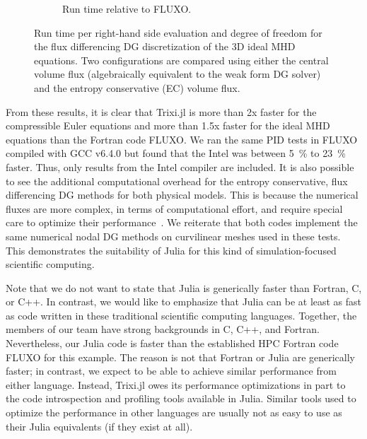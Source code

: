\documentclass{juliacon}
\newcommand{\trixi}{Trixi.jl\xspace}
\begin{document}
\begin{figure}[!ht]
\begin{subfigure}{\linewidth}
    \caption{Run time relative to FLUXO.}
  \end{subfigure}%
  \caption{Run time per right-hand side evaluation and degree of freedom for
           the flux differencing DG discretization of the 3D ideal MHD equations.
           Two configurations are compared using either the central volume flux
           (algebraically equivalent to the weak form DG solver) and the entropy
           conservative (EC) volume flux.}
  \label{fig:PID-MHD}
\end{figure}

From these results, it is clear that \trixi is more than 2x faster for the compressible Euler equations
and more than 1.5x faster for the ideal MHD equations than the Fortran code FLUXO.
We ran the same PID tests in FLUXO compiled with GCC v6.4.0 but found that
the Intel was between \SI{5}{\percent} to \SI{23}{\percent} faster.
Thus, only results from the Intel compiler are included.
It is also possible to see the additional computational overhead for the entropy conservative, flux
differencing DG methods for both physical models. This is because the numerical fluxes are more complex, in
terms of computational effort, and require special care to optimize their performance~\cite{hendrik_blog}.
We reiterate that both codes implement the same numerical nodal DG methods on curvilinear meshes used in these tests.
This demonstrates the suitability of Julia for this kind of simulation-focused scientific computing.

Note that we do not want to state that Julia is generically faster than Fortran,
C, or C++. In contrast, we would like to emphasize that Julia can be at least
as fast as code written in these traditional scientific computing languages.
Together, the members of our team have strong backgrounds in C, C++, and
Fortran. Nevertheless, our Julia code is faster than the established HPC Fortran
code FLUXO for this example. The reason is not that Fortran or Julia are generically
faster; in contrast, we expect to be able to achieve similar performance from either
language. Instead, \trixi owes its performance optimizations in part to the code
introspection and profiling tools available in Julia. Similar tools used to optimize the
performance in other languages are usually not as easy to use as their Julia
equivalents (if they exist at all).
\end{document}
